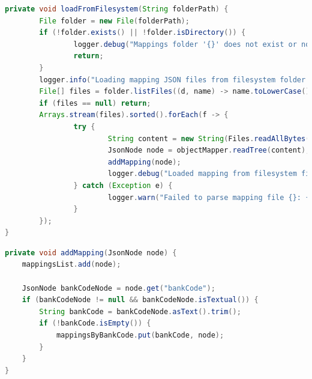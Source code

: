 \begin{lstlisting}[language=Java, frame=single, caption=Файл системээс mapping JSON-уудыг ачаалах]
private void loadFromFilesystem(String folderPath) {
		File folder = new File(folderPath);
		if (!folder.exists() || !folder.isDirectory()) {
				logger.debug("Mappings folder '{}' does not exist or not a directory — skipping filesystem load.", folderPath);
				return;
		}
		logger.info("Loading mapping JSON files from filesystem folder '{}'", folderPath);
		File[] files = folder.listFiles((d, name) -> name.toLowerCase().endsWith(".json"));
		if (files == null) return;
		Arrays.stream(files).sorted().forEach(f -> {
				try {
						String content = new String(Files.readAllBytes(f.toPath()));
						JsonNode node = objectMapper.readTree(content);
						addMapping(node);
						logger.debug("Loaded mapping from filesystem file: {}", f.getName());
				} catch (Exception e) {
						logger.warn("Failed to parse mapping file {}: {}", f.getName(), e.getMessage());
				}
		});
}
\end{lstlisting}

\begin{lstlisting}[language=Java, frame=single, caption=Банкны кодоор mapping-ийг индексжүүлэх]
private void addMapping(JsonNode node) {
	mappingsList.add(node);
	
	JsonNode bankCodeNode = node.get("bankCode");
	if (bankCodeNode != null && bankCodeNode.isTextual()) {
		String bankCode = bankCodeNode.asText().trim();
		if (!bankCode.isEmpty()) {
			mappingsByBankCode.put(bankCode, node);
		}
	}
}
\end{lstlisting}

